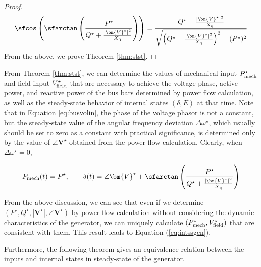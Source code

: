 \documentclass[graybox, envcountchap]{svmult}
\begin{document}
\begin{proof}
\begin{equation*}
  \sfcos \left( \sfarctan \left( \frac{P^{\star}}{Q^{\star} + \tfrac{ |\bm{V}^{\star}|^2}{X_{\rm q}} } \right) \right) =
  \frac{ Q^{\star} + \tfrac{|\bm{V}^{\star}|^2}{X_{\rm q}} }
  {  \sqrt{ \left( Q^{\star} + \tfrac{|\bm{V}^{\star}|^2}{X_{\rm q}} \right)^2 + (P^{\star})^2 }  }
\end{equation*}
From the above, we prove Theorem \ref{thm:stst}.

\end{proof}

From Theorem \ref{thm:stst}, we can determine the values of mechanical input
$P_{\rm mech}^{\star}$ and field input $V_{\rm field}^{\star}$ that are
necessary to achieve the voltage phase, active power, and reactive power of the
bus bars determined by power flow calculation, as well as the steady-state
behavior of internal states $(\delta, E)$ at that time. Note that in Equation
\ref{eq:busvolin}, the phase of the voltage phasor is not a constant, but the
steady-state value of the angular frequency deviation $\Delta \omega^{\star}$,
which usually should be set to zero as a constant with practical significance,
is determined only by the value of $\angle \bm{V}^{\star}$ obtained from the
power flow calculation. Clearly, when $\Delta \omega^{\star}=0$,

\begin{equation*}
  P_{{\rm mech}}(t) =    P^{\star},\qquad
  \delta (t)  = \angle \bm{V}^{\star}
  + \sfarctan \left( \frac{P^{\star}}{Q^{\star} + \tfrac{ |\bm{V}^{\star}|^2}{X_{\rm q}} } \right)
\end{equation*}

From the above discussion, we can see that even if we determine
$(P^{\star},Q^{\star},|\bm{V}^{\star}|,\angle \bm{V}^{\star})$ by power flow
calculation without considering the dynamic characteristics of the generator, we
can uniquely calculate $(P_{\rm mech}^{\star},V_{\rm field}^{\star})$ that are
consistent with them. This result leads to Equation (\ref{eq:intssgen}).

Furthermore, the following theorem gives an equivalence relation between the
inputs and internal states in steady-state of the generator.
\end{document}
